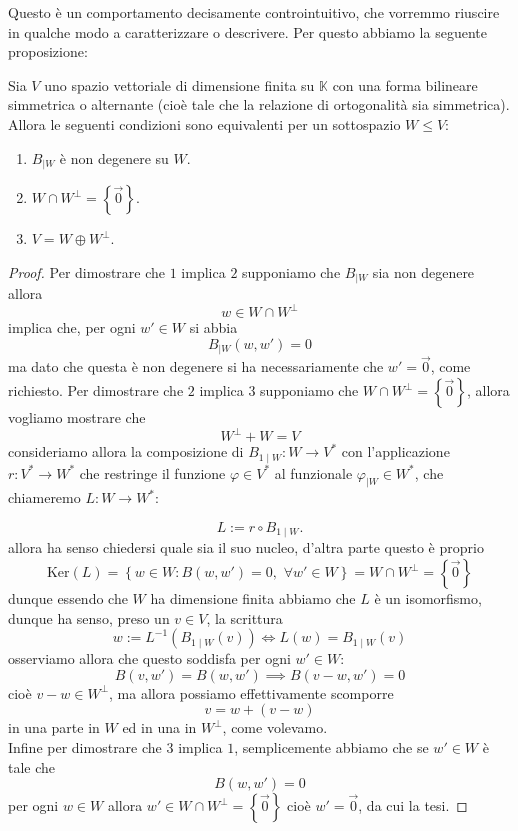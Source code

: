 \documentclass[11pt]{scrartcl}
\renewcommand{\ker}[1]{\text{Ker}\left(#1\right)}
\newcommand{\KK}{\mathbb{K}}
\begin{document}
	Questo è un comportamento decisamente controintuitivo, che vorremmo riuscire in qualche modo a caratterizzare o descrivere. Per questo abbiamo la seguente proposizione:
	\begin{proposition}
		Sia $V$ uno spazio vettoriale di dimensione finita su $\KK$ con una forma bilineare simmetrica o alternante (cioè tale che la relazione di ortogonalità sia simmetrica). Allora le seguenti condizioni sono equivalenti per un sottospazio $W\le V$:
		\begin{enumerate}
			\item $B_{\mid W}$ è non degenere su $W$.
			\item $W\cap W^\perp=\left\{\vec{0}\right\}$.
			\item $V=W\oplus W^\perp$.
		\end{enumerate}
	\end{proposition}
	\begin{proof}
		Per dimostrare che $1$ implica $2$ supponiamo che $B_{\mid W}$ sia non degenere allora 
		$$w\in W\cap W^\perp$$
		implica che, per ogni $w'\in W$ si abbia
		$$B_{\mid W}(w,w')=0$$
		ma dato che questa è non degenere si ha necessariamente che $w'=\vec{0}$, come richiesto. Per dimostrare che $2$ implica $3$ supponiamo che $W\cap W^\perp = \left\{\vec{0}\right\}$, allora vogliamo mostrare che
		$$W^\perp+W=V$$
		consideriamo allora la composizione di $B_{1\mid W}:W\to V^*$ con l'applicazione $r:V^*\to W^*$ che restringe il funzione $\varphi\in V^*$ al funzionale $\varphi_{\mid W}\in W^*$, che chiameremo $L:W\to W^*$:
		\begin{figure}[h]
			\begin{center}
			\end{center}
		\end{figure}
		$$L:=r\circ B_{1\mid W}.$$
		allora ha senso chiedersi quale sia il suo nucleo, d'altra parte questo è proprio
		$$\ker{L}=\left\{w\in W:B(w,w')=0,\,\,\forall w'\in W\right\}=W\cap W^\perp =\left\{\vec{0}\right\}$$
		dunque essendo che $W$ ha dimensione finita abbiamo che $L$ è un isomorfismo, dunque ha senso, preso un $v\in V$, la scrittura
		$$w:=L^{-1}\left(B_{1\mid W}(v)\right) \iff L(w)=B_{1\mid W}(v)$$
		osserviamo allora che questo soddisfa per ogni $w'\in W$:
		$$B(v,w')=B(w,w') \implies B(v-w,w')=0$$
		cioè $v-w\in W^\perp$, ma allora possiamo effettivamente scomporre
		$$v=w+\left(v-w\right)$$
		in una parte in $W$ ed in una in $W^\perp$, come volevamo. \\
		Infine per dimostrare che $3$ implica $1$, semplicemente abbiamo che se $w'\in W$ è tale che
		$$B(w,w')=0$$
		per ogni $w\in W$ allora $w'\in W\cap W^\perp=\left\{\vec{0}\right\}$ cioè $w'=\vec{0}$, da cui la tesi.
	\end{proof}
\end{document}
